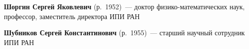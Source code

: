 \begin{multicols}{2}


\noindent 
\textbf{Шоргин Сергей Яковлевич} (р.\ 1952)~--- доктор фи\-зи\-ко-ма\-те\-ма\-ти\-че\-ских наук, 
профессор, заместитель директора ИПИ РАН

\vspace*{3pt}

\noindent 
\textbf{Шубников Сергей Константинович} (р.\ 1955)~--- старший научный сотрудник ИПИ РАН



 \label{end\stat}










\end{multicols}

\newpage